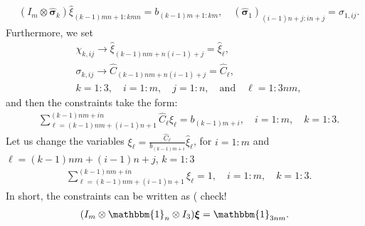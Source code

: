 \documentclass[12pt]{amsart}
\theoremstyle{definition}
\begin{document}
\begin{equation}\label{eq:c-1}
\begin{aligned}
&(I_m\otimes  \widehat{\bm\sigma}_k)\widehat\xi_{(k-1)mn+1:kmn} = 
b_{(k-1)m+1:km},\quad (\widehat{\bm{\sigma}}_1)_{(i-1)n+j:in+j}=\sigma_{1,ij}.
\end{aligned}
\end{equation}
Furthermore, we set
\[
\begin{aligned}
&\chi_{k,ij}\rightarrow\widehat\xi_{(k-1)nm+n(i-1)+j}=\widehat\xi_{\ell},\\
&\sigma_{k,ij}\rightarrow\widehat C_{(k-1)nm+n(i-1)+j}=\widehat C_{\ell},\\
& k=1:3,\quad i=1:m,\quad j=1:n,\quad \mbox{and}\quad \ell=1:3nm,
\end{aligned}
\]
and then the constraints take the form:
\begin{equation*}
\begin{aligned}
&\sum_{\ell=(k-1)nm+(i-1)n+1}^{(k-1)nm+in} \widehat C_{\ell} \widehat\xi_{\ell}=b_{(k-1)m+i}, \quad i=1:m,\quad k=1:3. 
\end{aligned}
\end{equation*}
Let us change the variables $\xi_\ell=\frac{\widehat C_{\ell}}{b_{(k-1)m+i}}\widehat\xi_{\ell}$, for $i=1:m$ and $\ell=(k-1)nm+(i-1)n+j$, \quad $k=1:3$
\begin{equation*}
\begin{aligned}
&\sum_{\ell=(k-1)nm+(i-1)n+1}^{(k-1)nm+in} \xi_{\ell}=1, \quad i=1:m,\quad k=1:3. 
\end{aligned}
\end{equation*}
In short, the constraints can be written as ({\color{red} check!}
\begin{equation*}
\begin{aligned}
(I_m\otimes\mathbbm{1}_n\otimes I_3)\bm{\xi}=\mathbbm{1}_{3nm}. 
\end{aligned}
\end{equation*}
\end{document}
